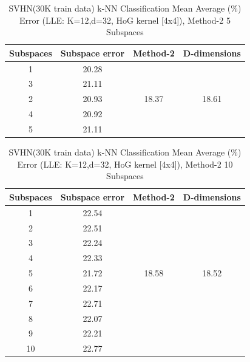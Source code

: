 \begin{table}[H]
\centering
\label{tab:table14}
\begin{tabular}{|c|c|c|c|}
\hline
\textlatin{Subspaces} & \textlatin{Subspace error} & \textlatin{Method-2} & \textlatin{D-dimensions}  \\
\hline
1 & 20.28 & & \\
3 & 21.11 & & \\
2 & 20.93 & 18.37 & 18.61 \\
4 & 20.92 & & \\
5 & 21.11 & & \\
\hline
\end{tabular}
\caption{\textlatin{SVHN(30K train data) k-NN Classification Mean Average (\%) Error (LLE: K=12,d=32, HoG kernel [4x4]), Method-2 5 Subspaces}}
\end{table}

\begin{table}[H]
\centering
\label{tab:table14}
\begin{tabular}{|c|c|c|c|}
\hline
\textlatin{Subspaces} & \textlatin{Subspace error} & \textlatin{Method-2} & \textlatin{D-dimensions}  \\
\hline
1 & 22.54 & & \\
2 & 22.51 & & \\
3 & 22.24 & & \\
4 & 22.33 & & \\
5 & 21.72 & 18.58 & 18.52 \\
6 & 22.17 & & \\
7 & 22.71 & & \\
8 & 22.07 & & \\
9 & 22.21 & & \\
10 & 22.77 & & \\
\hline
\end{tabular}
\caption{\textlatin{SVHN(30K train data) k-NN Classification Mean Average (\%) Error (LLE: K=12,d=32, HoG kernel [4x4]), Method-2 10 Subspaces}}
\end{table}

